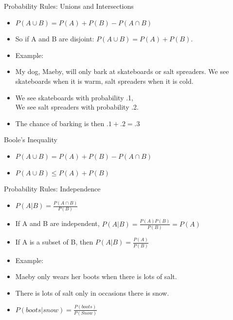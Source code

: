 \documentclass{beamer}
\numberwithin{equation}{section}
\begin{document}
\begin{frame}{Probability Rules: Unions and Intersections}

\begin{itemize}

\item $P(A\cup B) = P(A)+P(B)-P(A\cap B)$\pause
\item So if A and B are disjoint: $P(A\cup B) = P(A)+P(B)$.\pause
\item Example:
\item My dog, Maeby, will only bark at skateboards or salt spreaders.  We see skateboards when it is warm, salt spreaders when it is cold. \pause
\item We see skateboards with probability .1, \\We see salt spreaders with probability .2.\pause
\item The chance of barking is then $.1+.2=.3$
\end{itemize}

\end{frame}

\begin{frame}{Boole's Inequality}

\begin{itemize}

\item $P(A\cup B) = P(A)+P(B)-P(A\cap B)$
\item $P(A\cup B) \leq P(A)+P(B)$
\end{itemize}

\end{frame}




\begin{frame}{Probability Rules: Independence}

\begin{itemize}
\item $P(A|B)=\frac{P(A\cap B)}{P(B)}$\pause
\item If A and B are independent, $P(A|B)=\frac{P(A)P(B)}{P(B)}=P(A)$
\item If A is a subset of B, then $P(A|B)=\frac{P(A)}{P(B)}$\pause
\item Example:
\item Maeby only wears her boots when there is lots of salt.\pause
\item There is lots of salt only in occasions there is snow.\pause
\item $P(boots|snow)= \frac{P(boots)}{P(Snow)}$\
\end{itemize}

\end{frame}
\end{document}
